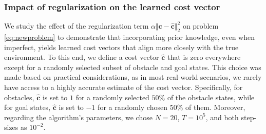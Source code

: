 \documentclass[10pt]{article} %
\def\vc{{\bm{c}}}
\begin{document}
\subsubsection{Impact of regularization on the learned cost vector}
We study the effect of the regularization term $\alpha\Vert\mathbf{c} - \hat{\mathbf{c}}\Vert^2_2$ on problem \eqref{eq:newproblem} to demonstrate that incorporating prior knowledge, even when imperfect, yields learned cost vectors that align more closely with the true environment. To this end, we define a cost vector $\hat{\vc}$ that is zero everywhere except for a randomly selected subset of obstacle and goal states. This choice was made based on practical considerations, as in most real-world scenarios, we rarely have access to a highly accurate estimate of the cost vector. Specifically, for obstacles, $\hat{\vc}$ is set to $1$ for a randomly selected $50\%$ of the obstacle states, while for goal states, $\hat{\mathbf{c}}$ is set to $-1$ for a randomly chosen $50\%$ of them. Moreover, regarding the algorithm's parameters, we chose $N=20$, $T=10^{5}$, and both step-sizes as $10^{-2}$. \par
\end{document}

